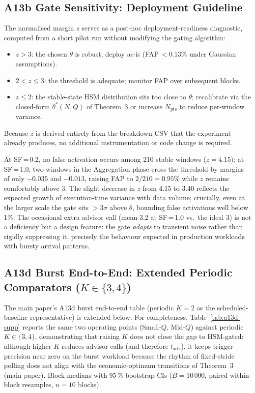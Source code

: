 \documentclass[10pt,twocolumn,a4paper]{article}
\newcommand{\Npts}{N_{\mathrm{pts}}}
\newcommand{\thetastar}{\theta^{*}}
\begin{document}
\subsection{A13b Gate Sensitivity: Deployment Guideline}

The normalised margin $z$ serves as a post-hoc deployment-readiness
diagnostic, computed from a short pilot run without modifying the
gating algorithm:

\begin{itemize}
\item $z>3$: the chosen $\theta$ is robust; deploy as-is
(FAP\,$<0.13\%$ under Gaussian assumptions).
\item $2<z\le3$: the threshold is adequate; monitor FAP over
subsequent blocks.
\item $z\le2$: the stable-state HSM distribution sits too close to
$\theta$; recalibrate via the closed-form
$\thetastar(N,Q)$ of Theorem~3 or increase
$\Npts$ to reduce per-window variance.
\end{itemize}

\noindent Because $z$ is derived entirely from the breakdown CSV that
the experiment already produces, no additional instrumentation
or code change is required.

At SF\,=\,0.2, no false activation occurs among 210 stable windows
($z\!=\!4.15$); at SF\,=\,1.0, two windows in the Aggregation phase
cross the threshold by margins of only $-0.035$ and $-0.013$, raising
FAP to $2/210\!=\!0.95\%$ while $z$ remains comfortably above 3.
The slight decrease in $z$ from 4.15 to 3.40 reflects the expected
growth of execution-time variance with data volume; crucially, even at
the larger scale the gate sits $>3\sigma$ above $\theta$, bounding
false activations well below 1\%.
The occasional extra advisor call (mean 3.2 at SF\,=\,1.0 vs.\
the ideal 3) is not a deficiency but a design feature: the gate
\emph{adapts} to transient noise rather than rigidly suppressing it,
precisely the behaviour expected in production workloads with bursty
arrival patterns.

\subsection{A13d Burst End-to-End: Extended Periodic Comparators ($K\!\in\!\{3,4\}$)}

The main paper's A13d burst end-to-end table (periodic $K\!=\!2$ as the
scheduled-baseline representative) is extended below.  For completeness, Table~\ref{tab:a13d-supp}
reports the same two operating points (Small-$Q$, Mid-$Q$) against
periodic $K\!\in\!\{3,4\}$, demonstrating that raising $K$ does not
close the gap to HSM-gated: although higher $K$ reduces advisor
calls (and therefore $t_{\mathrm{adv}}$), it keeps trigger precision
near zero on the burst workload because the rhythm of fixed-stride
polling does not align with the economic-optimum
transitions of Theorem~3 (main paper).  Block medians with 95\,\% bootstrap CIs
($B\!=\!10\,000$, paired within-block resamples, $n\!=\!10$ blocks).
\end{document}
